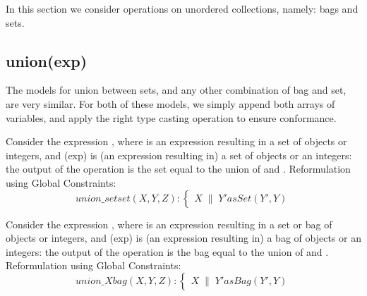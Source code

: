 In this section we consider operations on unordered collections, namely: bags and sets.

\newpage\subsection{union(exp)}
The models for union between sets, and any other combination of bag and set, are very similar.
For both of these models, we simply append both arrays of variables, and apply the right type casting operation to ensure conformance.

Consider the expression , where  is an expression resulting in a set of objects or integers, and \inelineocl(exp) is (an expression resulting in) a set of objects or an integers: the output of the operation is the set equal to the union of  and .
Reformulation using Global Constraints:
\begin{equation}\label{csp:union_setset}
    union\_setset(X,Y,Z):
    \begin{cases}
        X \;\mathbin{\|}\; Y'
        asSet(Y',Y)
    \end{cases}
\end{equation}

Consider the expression , where  is an expression resulting in a set or bag of objects or integers, and \inelineocl(exp) is (an expression resulting in) a bag of objects or an integers: the output of the operation is the bag equal to the union of  and .
Reformulation using Global Constraints:
\begin{equation}\label{csp:union_Xbag}
    union\_Xbag(X,Y,Z):
    \begin{cases}
        X \;\mathbin{\|}\; Y'
        asBag(Y',Y)
    \end{cases}
\end{equation}

